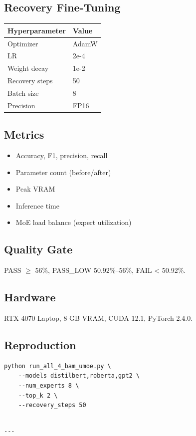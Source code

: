 \subsection{Recovery Fine-Tuning}

\begin{table}[H]
\centering
\small
\begin{tabular}{ll}
\toprule
\textbf{Hyperparameter} & \textbf{Value} \\
\midrule
Optimizer & AdamW \\
LR & 2e-4 \\
Weight decay & 1e-2 \\
Recovery steps & 50 \\
Batch size & 8 \\
Precision & FP16 \\
\bottomrule
\end{tabular}
\end{table}

\subsection{Metrics}

\begin{itemize}
\item Accuracy, F1, precision, recall
\item Parameter count (before/after)
\item Peak VRAM
\item Inference time
\item MoE load balance (expert utilization)

\end{itemize}
\subsection{Quality Gate}

PASS $\ge$ 56\%, PASS\_LOW 50.92\%--56\%, FAIL < 50.92\%.

\subsection{Hardware}

RTX 4070 Laptop, 8 GB VRAM, CUDA 12.1, PyTorch 2.4.0.

\subsection{Reproduction}

\begin{lstlisting}
python run_all_4_bam_umoe.py \
    --models distilbert,roberta,gpt2 \
    --num_experts 8 \
    --top_k 2 \
    --recovery_steps 50
\end{lstlisting}
\begin{lstlisting}

---
\end{lstlisting}